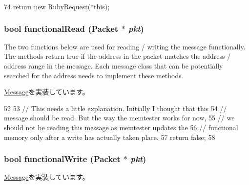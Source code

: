 \begin{DoxyCode}
74 { return new RubyRequest(*this); }
\end{DoxyCode}
\hypertarget{classRubyRequest_a729f57f557bb42c045c47d9388f1030e}{
\subsubsection[{functionalRead}]{\setlength{\rightskip}{0pt plus 5cm}bool functionalRead ({\bf Packet} $\ast$ {\em pkt})}}
\label{classRubyRequest_a729f57f557bb42c045c47d9388f1030e}
The two functions below are used for reading / writing the message functionally. The methods return true if the address in the packet matches the address / address range in the message. Each message class that can be potentially searched for the address needs to implement these methods. 

\hyperlink{classMessage_a050cc08996aae4295aee40e8871788b7}{Message}を実装しています。


\begin{DoxyCode}
52 {
53     // This needs a little explanation. Initially I thought that this
54     // message should be read. But the way the memtester works for now,
55     // we should not be reading this message as memtester updates the
56     // functional memory only after a write has actually taken place.
57     return false;
58 }
\end{DoxyCode}
\hypertarget{classRubyRequest_a14bf46f4c6bb79e5357096af6b9dbffa}{
\subsubsection[{functionalWrite}]{\setlength{\rightskip}{0pt plus 5cm}bool functionalWrite ({\bf Packet} $\ast$ {\em pkt})}}
\label{classRubyRequest_a14bf46f4c6bb79e5357096af6b9dbffa}


\hyperlink{classMessage_a1a7af86f43fb867628a3c3cf76e4dcc9}{Message}を実装しています。


